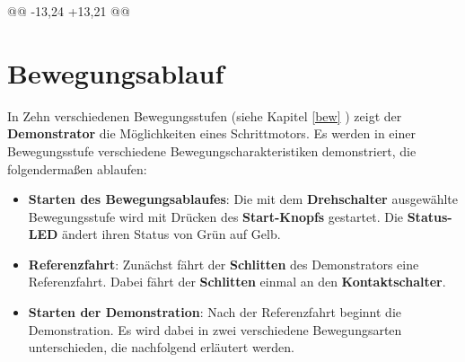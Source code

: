 @@ -13,24 +13,21 @@

\chapter{Bewegungsablauf}

In Zehn verschiedenen Bewegungsstufen (siehe Kapitel \ref{bew} ) zeigt der \textbf{Demonstrator} die Möglichkeiten eines Schrittmotors. Es werden in einer Bewegungsstufe verschiedene Bewegungscharakteristiken demonstriert, die folgendermaßen ablaufen:  

\begin{itemize}
\item \textbf{Starten des Bewegungsablaufes}: Die mit dem \textbf{Drehschalter} ausgewählte Bewegungsstufe wird mit Drücken des \textbf{Start-Knopfs} gestartet. Die \textbf{Status-LED} ändert ihren Status von Grün auf Gelb.  
\end{itemize}

\begin{itemize}
\item \textbf{Referenzfahrt}: Zunächst fährt der \textbf{Schlitten} des Demonstrators eine Referenzfahrt. Dabei fährt der \textbf{Schlitten} einmal an den \textbf{Kontaktschalter}.
\end{itemize}

\begin{itemize}
\item \textbf{Starten der Demonstration}: Nach der Referenzfahrt beginnt die Demonstration. Es wird dabei in zwei verschiedene Bewegungsarten unterschieden, die nachfolgend erläutert werden.
\end{itemize}

